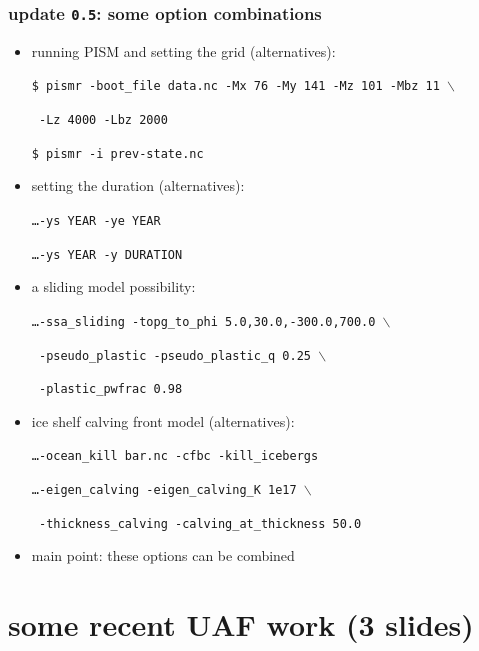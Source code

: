 \documentclass[hide notes,intlimits]{beamer}
\begin{document}
\begin{frame}
  \frametitle{update \texttt{0.5}: some option combinations}
  \begin{itemize}
  \item running PISM and setting the grid (alternatives):
    \small

    \texttt{\$ pismr -boot\_file data.nc -Mx 76 -My 141 -Mz 101 -Mbz 11 $\backslash$}
    
    \texttt{\phantom{foobar} -Lz 4000 -Lbz 2000}

    \texttt{\$ pismr -i prev-state.nc}
    \normalsize
  \item setting the duration (alternatives):
    \small

    \texttt{\dots\quad -ys YEAR -ye YEAR}
    
    \texttt{\dots\quad -ys YEAR -y DURATION}
    \normalsize
  \item a sliding model possibility:
    \small

    \texttt{\dots\quad -ssa\_sliding -topg\_to\_phi 5.0,30.0,-300.0,700.0 $\backslash$}
    
    \texttt{\phantom{foobar} -pseudo\_plastic -pseudo\_plastic\_q 0.25 $\backslash$}
    
    \texttt{\phantom{foobar} -plastic\_pwfrac 0.98 }
    \normalsize

  \item ice shelf calving front model (alternatives):
    \small

    \texttt{\dots\quad -ocean\_kill bar.nc -cfbc -kill\_icebergs}

    \texttt{\dots\quad -eigen\_calving -eigen\_calving\_K 1e17 $\backslash$}
    
    \texttt{\phantom{foobar} -thickness\_calving -calving\_at\_thickness 50.0}
    \normalsize
  \item \alert{main point:}  these options can be combined
  \end{itemize}
\end{frame}


\section[UAF work]{some recent UAF work (3 slides)}
\end{document}
